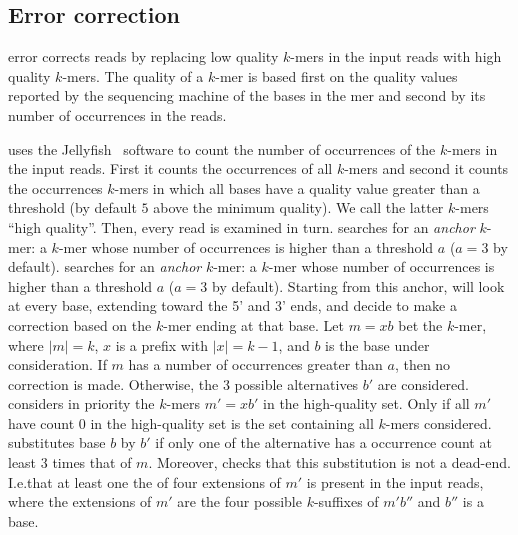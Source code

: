 \documentclass[10pt]{bmc_article}
\newenvironment{bmcformat}{\fussy\setboolean{publ}{true}}{\fussy}
\begin{document}
\begin{bmcformat}
\subsection*{Error correction}
\label{sec:meth-error-correction}

\quorum error corrects reads by replacing low quality $k$-mers in the input reads with high quality $k$-mers.
The quality of a $k$-mer is based first on the quality values reported by the sequencing machine of the bases in the mer and second by its number of occurrences in the reads.

\quorum uses the Jellyfish~\cite{Marcais2011} software to count the number of occurrences of the $k$-mers in the input reads.
First it counts the occurrences of all $k$-mers and second it counts the occurrences $k$-mers in which all bases have a quality value greater than a threshold (by default $5$ above the minimum quality). We call the latter $k$-mers ``high quality''.
Then, every read is examined in turn.
\quorum searches for an \emph{anchor} $k$-mer: a $k$-mer whose number of occurrences is higher than a threshold $a$ ($a = 3$ by default).
\quorum searches for an \emph{anchor} $k$-mer: a $k$-mer whose number of occurrences is higher than a threshold $a$ ($a = 3$ by default). 
Starting from this anchor, \quorum will look at every base, extending toward the 5' and 3' ends, and decide to make a correction based on the $k$-mer ending at that base.
Let $m = xb$ bet the $k$-mer, where $|m| = k$, $x$ is a prefix with $|x| = k - 1$, and $b$ is the base under consideration.
If $m$ has a number of occurrences greater than $a$, then no correction is made.
Otherwise, the 3 possible alternatives $b'$ are considered.
\quorum considers in priority the $k$-mers $m' = xb'$ in the high-quality set.
Only if all $m'$ have count 0 in the high-quality set is the set containing all $k$-mers considered.
\quorum substitutes base $b$ by $b'$ if only one of the alternative has a occurrence count at least 3 times that of $m$.
Moreover, \quorum checks that this substitution is not a dead-end.
I.e.\@ that at least one the of four extensions of $m'$ is present in the input reads, where the extensions of $m'$ are the four possible $k$-suffixes of $m'b''$ and $b''$ is a base.


\end{bmcformat}
\end{document}
